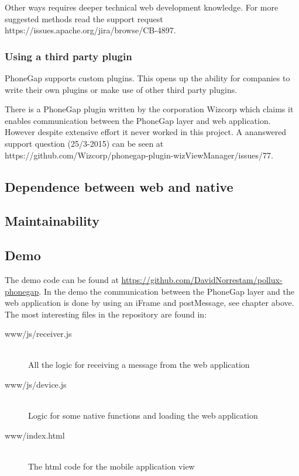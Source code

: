 Other ways requires deeper technical web development knowledge. For more suggested methods read the support request https://issues.apache.org/jira/browse/CB-4897.

\subsubsection{Using a third party plugin}
PhoneGap supports custom plugins. This opens up the ability for companies to write their own plugins or make use of other third party plugins.

There is a PhoneGap plugin written by the corporation Wizcorp which claims it enables communication between the PhoneGap layer and web application. However despite extensive effort it never worked in this project. A ananswered support question (25/3-2015) can be seen at https://github.com/Wizcorp/phonegap-plugin-wizViewManager/issues/77. 

\subsection{Dependence between web and native}

\subsection{Maintainability}

\subsection{Demo}
The demo code can be found at \url{https://github.com/DavidNorrestam/pollux-phonegap}. In the demo the communication between the PhoneGap layer and the web application is done by using an iFrame and postMessage, see chapter above. The most interesting files in the repository are found in:

\begin{description}
  \item[www/js/receiver.js] \hfill \\
    All the logic for receiving a message from the web application
  \item[www/js/device.js] \hfill \\
    Logic for some native functions and loading the web application
  \item[www/index.html] \hfill \\
    The html code for the mobile application view
\end{description}


